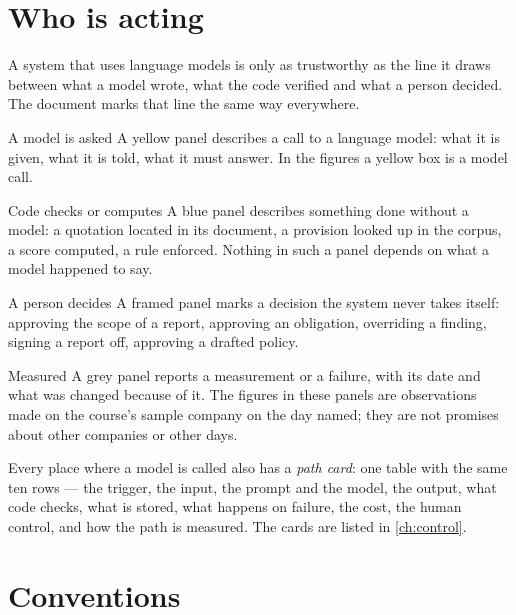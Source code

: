 \section*{Who is acting}

A system that uses language models is only as trustworthy as the line it draws between what a
model wrote, what the code verified and what a person decided. The document marks that line
the same way everywhere.

\begin{aibox}{A model is asked}
A yellow panel describes a call to a language model: what it is given, what it is told, what it
must answer. In the figures a yellow box is a model call.
\end{aibox}

\begin{codebox}{Code checks or computes}
A blue panel describes something done without a model: a quotation located in its document, a
provision looked up in the corpus, a score computed, a rule enforced. Nothing in such a panel
depends on what a model happened to say.
\end{codebox}

\begin{humanbox}{A person decides}
A framed panel marks a decision the system never takes itself: approving the scope of a
report, approving an obligation, overriding a finding, signing a report off, approving a
drafted policy.
\end{humanbox}

\begin{lessonbox}{Measured}
A grey panel reports a measurement or a failure, with its date and what was changed because of
it. The figures in these panels are observations made on the course's sample company on the
day named; they are not promises about other companies or other days.
\end{lessonbox}

Every place where a model is called also has a \emph{path card}: one table with the same ten
rows --- the trigger, the input, the prompt and the model, the output, what code checks, what is
stored, what happens on failure, the cost, the human control, and how the path is measured.
The cards are listed in \cref{ch:control}.

\section*{Conventions}

